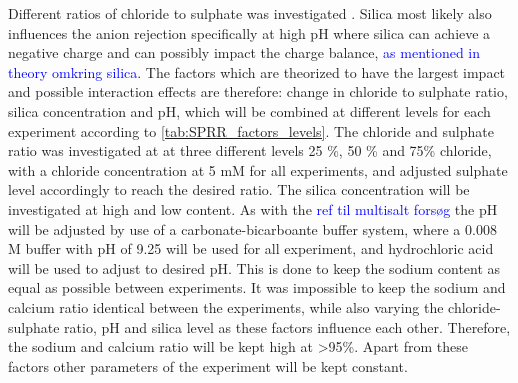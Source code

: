 Different ratios of chloride to sulphate was investigated . 
Silica most likely also influences the anion rejection specifically at high pH where silica can achieve a negative charge and can possibly impact the charge balance, \textcolor{blue}{as mentioned in theory omkring silica}.
The factors which are theorized to have the largest impact and possible interaction effects are therefore: change in chloride to sulphate ratio, silica concentration and pH, which will be combined at different levels for each experiment according to \cref{tab:SPRR_factors_levels}. 
The chloride and sulphate ratio was investigated at at three different levels 25 \%, 50 \% and 75\% chloride, with a chloride concentration at 5 mM for all experiments, and adjusted sulphate level accordingly to reach the desired ratio. 
The silica concentration will be investigated at high and low content.
As with the \textcolor{blue}{ref til multisalt forsøg} the pH will be adjusted by use of a carbonate-bicarboante buffer system, where a 0.008 M buffer with pH of 9.25 will be used for all experiment, and hydrochloric acid will be used to adjust to desired pH.
This is done to keep the sodium content as equal as possible between experiments. 
It was impossible to keep the sodium and calcium ratio identical between the experiments, while also varying the chloride-sulphate ratio, pH and silica level as these factors influence each other. 
Therefore, the sodium and calcium ratio will be kept high at >95\%.
Apart from these factors other parameters of the experiment will be kept constant.



